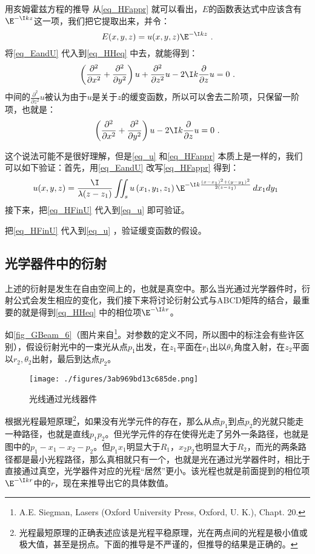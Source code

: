 \begin{example}{用亥姆霍兹方程的推导}
从\autoref{eq_HFappr} 就可以看出，$E$的函数表达式中应该含有$\E^{-\I kz}$这一项，我们把它提取出来，并令：
\begin{equation}\label{eq_EandU}
E(x,y,z)=u(x,y,z)\E^{-\I kz}~.
\end{equation}
将\autoref{eq_EandU} 代入到\autoref{eq_HHeq} 中去，就能得到：
\begin{equation}
\left(\frac{\partial^2}{\partial x^2}+\frac{\partial^2}{\partial y^2}\right)u+\frac{\partial^2}{\partial z^2}u-2\I k\frac{\partial}{\partial z}u=0~.
\end{equation}
中间的$\frac{\partial^2}{\partial z^2}u$被认为由于$u$是关于$z$的缓变函数，所以可以舍去二阶项，只保留一阶项，也就是：
\begin{equation}\label{eq_u}
\left(\frac{\partial^2}{\partial x^2}+\frac{\partial^2}{\partial y^2}\right)u-2\I k\frac{\partial}{\partial z}u=0~.
\end{equation}

这个说法可能不是很好理解，但是\autoref{eq_u} 和\autoref{eq_HFappr} 本质上是一样的，我们可以如下验证：首先，用\autoref{eq_EandU} 改写\autoref{eq_HFappr} 得到：
\begin{equation}\label{eq_HFinU}
u(x,y,z)=\frac{\I}{\lambda(z-z_1)}\iint_s u\left(x_1,y_1,z_1\right)\E^{-\I k\frac{(x-x_1)^2+(y-y_1)^2}{2(z-z_1)}}\,dx_1dy_1~
\end{equation}
接下来，把\autoref{eq_HFinU} 代入到\autoref{eq_u} 即可验证。
\end{example}
\begin{exercise}{}
把\autoref{eq_HFinU} 代入到\autoref{eq_u} ，验证缓变函数的假设。
\end{exercise}

\subsection{光学器件中的衍射}
上述的衍射是发生在自由空间上的，也就是真空中。那么当光通过光学器件时，衍射公式会发生相应的变化，我们接下来将讨论衍射公式与ABCD矩阵的结合，最重要的就是得到\autoref{eq_HHeq} 中的相位项$\E^{-\I kr}$。

如\autoref{fig_GBeam_6}（图片来自\footnote{A.E. Siegman, Lasers (Oxford University Press, Oxford, U. K.), Chapt. 20.}。对参数的定义不同，所以图中的标注会有些许区别），假设衍射光中的一束光从点$p_1$出发，在$z_1$平面在$r_1$出以$\theta_1$角度入射，在$z_2$平面以$r_2,\theta_2$出射，最后到达点$p_2$。
\begin{figure}[ht]
\centering
\texttt{[image: ./figures/3ab969bd13c685de.png]}
\caption{光线通过光线器件} \label{fig_GBeam_6}
\end{figure}
根据光程最短原理\footnote{光程最短原理的正确表述应该是光程平稳原理，光在两点间的光程是极小值或极大值，甚至是拐点。下面的推导是不严谨的，但推导的结果是正确的。}，如果没有光学元件的存在，那么从点$p_1$到点$p_2$的光就只能走一种路径，也就是直线$p_1p_2$。但光学元件的存在使得光走了另外一条路径，也就是图中的$p_1-x_1-x_2-p_2$。但$p_1x_1$明显大于$R_1$，$x_2p_2$也明显大于$R_2$，而光的两条路径都是最小光程路径，那么真相就只有一个，也就是光在通过光学器件时，相比于直接通过真空，光学器件对应的光程“居然”更小。该光程也就是前面提到的相位项$\E^{-\I kr}$中的$r$，现在来推导出它的具体数值。

